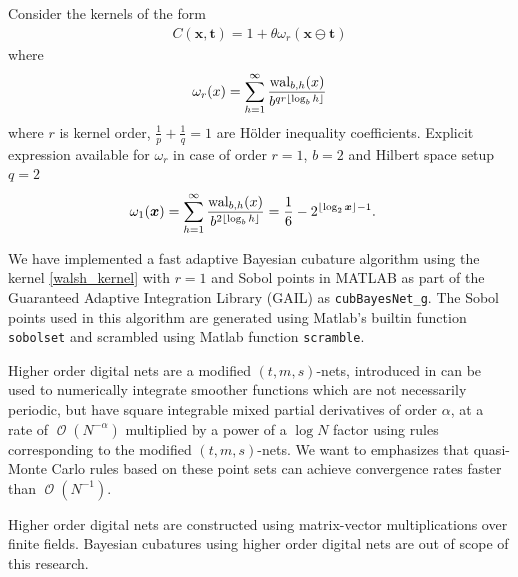 \documentclass{iitthesis}          %
\DeclareMathOperator{\Order}{{\mathcal O}}
\newcommand{\bm}[1]{\boldsymbol{#1}}
\newcommand{\vt}{\bm{t}}
\newcommand{\vx}{\bm{x}}
\newcommand{\code}[1]{\texttt{#1}}
\begin{document}
Consider the kernels of the form \cite{Nuyens2013}
\begin{align}
\label{walsh_kernel}
C(\vx, \vt) = 1 + \theta \omega_{r} (\vx \ominus \vt)
\end{align}
where 
\begin{align*}
\omega_r(x) = \sum_{h=1}^\infty 
\frac{\textup{wal}_{b,h}(x) }{b^{qr \lfloor \log_b h \rfloor}}
\end{align*}
where $r$ is kernel order, $\frac 1p + \frac 1q = 1$ are H\"older inequality coefficients. Explicit expression available for $\omega_{r}$ \cite{Nuyens2013} in case of order $r=1$, $b=2$ and Hilbert space setup $q=2$
\begin{align}
\omega_1(\vx) &= \sum_{h=1}^\infty 
\frac{\textup{wal}_{b,h}(x) }{b^{2 \lfloor \log_b h \rfloor}} = \frac 16 - 2^{\lfloor \log_2 \vx\rfloor -1 }.
\end{align}

We have implemented a fast adaptive Bayesian cubature algorithm using the kernel \eqref{walsh_kernel} with $r=1$ and Sobol points in MATLAB as part of the Guaranteed Adaptive Integration Library (GAIL) \cite{ChoEtal17b} as \allowbreak \code{cubBayesNet\_g}. The Sobol points used in this algorithm are generated using Matlab's builtin function \code{sobolset} and scrambled using Matlab function \code{scramble}.


Higher order digital nets are a modified $(t,m,s)$-nets, introduced in \cite{Dic08a} can be used to numerically integrate smoother functions which are not necessarily periodic, but have square integrable mixed partial derivatives of order $\alpha$, at a rate of $\Order(N^{-\alpha})$ multiplied by a power of a $\log N$ factor using rules corresponding to the modified $(t,m, s)$-nets.
We want to emphasizes that quasi-Monte Carlo rules based on these point sets can achieve convergence rates faster than $\Order(N^{-1})$.

Higher order digital nets are constructed using matrix-vector multiplications over finite
fields. Bayesian cubatures using higher order digital nets are out of scope of this research.


\clearpage




\label{sec:NumExp}


\label{period_var_tx}
\end{document}
